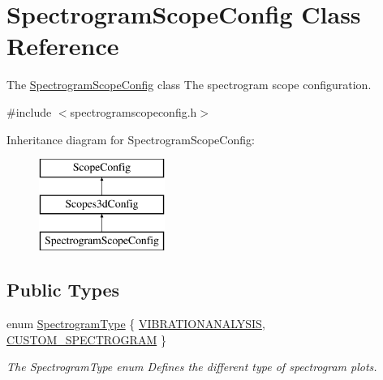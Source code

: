 \hypertarget{class_spectrogram_scope_config}{\section{\-Spectrogram\-Scope\-Config \-Class \-Reference}
\label{class_spectrogram_scope_config}
}


\-The \hyperlink{class_spectrogram_scope_config}{\-Spectrogram\-Scope\-Config} class \-The spectrogram scope configuration.  




{\ttfamily \#include $<$spectrogramscopeconfig.\-h$>$}

\-Inheritance diagram for \-Spectrogram\-Scope\-Config\-:\begin{figure}[H]
\begin{center}
\leavevmode
\includegraphics[height=3.000000cm]{class_spectrogram_scope_config}
\end{center}
\end{figure}
\subsection*{\-Public \-Types}
\begin{DoxyCompactItemize}
\item 
enum \hyperlink{group___scope_plugin_ga4c227eca53956a4dda5ee8877b7868c6}{\-Spectrogram\-Type} \{ \hyperlink{group___scope_plugin_gga4c227eca53956a4dda5ee8877b7868c6a1412daaa24267bf3b82a82d8b8427238}{\-V\-I\-B\-R\-A\-T\-I\-O\-N\-A\-N\-A\-L\-Y\-S\-I\-S}, 
\hyperlink{group___scope_plugin_gga4c227eca53956a4dda5ee8877b7868c6a7f0d2eab37446fb5b0e0136911fa069f}{\-C\-U\-S\-T\-O\-M\-\_\-\-S\-P\-E\-C\-T\-R\-O\-G\-R\-A\-M}
 \}
\begin{DoxyCompactList}\small\item\em \-The \-Spectrogram\-Type enum \-Defines the different type of spectrogram plots. \end{DoxyCompactList}\end{DoxyCompactItemize}
